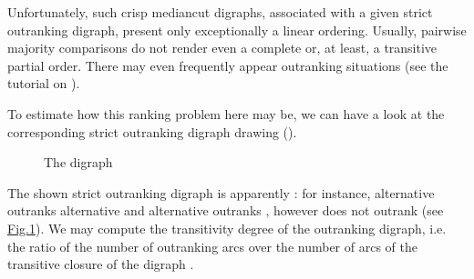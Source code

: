 \documentclass[a4paper,12pt,english]{sphinxhowto}
\let\sphinxpxdimen\pdfpxdimen\else\newdimen\sphinxpxdimen
\begin{document}
Unfortunately, such crisp median\sphinxhyphen{}cut  digraphs, associated with a given strict outranking digraph, present only exceptionally a linear ordering. Usually, pairwise majority comparisons do not render even a complete or, at least, a transitive partial order. There may even frequently appear  outranking situations (see the tutorial on {\hyperref[\detokenize{tutorial:linearvoting-tutorial-label}]{}}).

To estimate how  this ranking problem here may be, we can have a look at the corresponding strict outranking digraph  drawing (\sphinxfootnotemark[1]).

\begin{sphinxVerbatim}[commandchars=\\\{\},numbers=left,firstnumber=1,stepnumber=1]
\end{sphinxVerbatim}

\begin{figure}[H]
\centering
\capstart

\noindent\sphinxincludegraphics[width=300\sphinxpxdimen]{{rankingTutorial}.png}
\caption{The  digraph}\label{\detokenize{tutorial:rankingtutorial}}\end{figure}

The shown strict outranking digraph is apparently : for instance, alternative  outranks alternative  and alternative  outranks , however  does not outrank  (see \hyperref[\detokenize{tutorial:rankingtutorial}]{Fig.\@ \ref{\detokenize{tutorial:rankingtutorial}}}). We may compute the transitivity degree of the outranking digraph, i.e. the ratio of the number of outranking arcs over the number of arcs of the transitive closure of the digraph .
\end{document}
